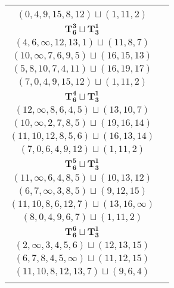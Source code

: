\documentclass{article}
\begin{document}
\begin{longtable}{|c|c|}
\begin{tabular}{c}
        $(8,10,7,4,\infty,12)\sqcup(18,15,13)$ \\ 
        $(0,4,9,15,8,12)\sqcup(1,11,2)$
        \end{tabular} \\ 
        \hline
        $\mathbf{T_{6}^{3}} \sqcup \mathbf{T_{3}^{1}}$ & \begin{tabular}{c}
        $(5,4,2,3,6,0)\sqcup(9,\infty,11)$ \\ 
        $(4,6,\infty,12,13,1)\sqcup(11,8,7)$ \\ 
        $(10,\infty,7,6,9,5)\sqcup(16,15,13)$ \\ 
        $(5,8,10,7,4,11)\sqcup(16,19,17)$ \\ 
        $(7,0,4,9,15,12)\sqcup(1,11,2)$
        \end{tabular} \\ 
        \hline
        $\mathbf{T_{6}^{4}} \sqcup \mathbf{T_{3}^{1}}$ & \begin{tabular}{c}
        $(5,4,7,2,1,3)\sqcup(8,11,\infty)$ \\ 
        $(12,\infty,8,6,4,5)\sqcup(13,10,7)$ \\ 
        $(10,\infty,2,7,8,5)\sqcup(19,16,14)$ \\ 
        $(11,10,12,8,5,6)\sqcup(16,13,14)$ \\ 
        $(7,0,6,4,9,12)\sqcup(1,11,2)$
        \end{tabular} \\ 
        \hline
        $\mathbf{T_{6}^{5}} \sqcup \mathbf{T_{3}^{1}}$ & \begin{tabular}{c}
        $(1,2,4,5,0,3)\sqcup(8,11,14)$ \\ 
        $(11,\infty,6,4,8,5)\sqcup(10,13,12)$ \\ 
        $(6,7,\infty,3,8,5)\sqcup(9,12,15)$ \\ 
        $(11,10,8,6,12,7)\sqcup(13,16,\infty)$ \\ 
        $(8,0,4,9,6,7)\sqcup(1,11,2)$
        \end{tabular} \\ 
        \hline
        $\mathbf{T_{6}^{6}} \sqcup \mathbf{T_{3}^{1}}$ & \begin{tabular}{c}
        $(1,2,0,3,4,5)\sqcup(11,8,\infty)$ \\ 
        $(2,\infty,3,4,5,6)\sqcup(12,13,15)$ \\ 
        $(6,7,8,4,5,\infty)\sqcup(11,12,15)$ \\ 
        $(11,10,8,12,13,7)\sqcup(9,6,4)$ \\ 

\end{tabular}
\end{longtable}
\end{document}
